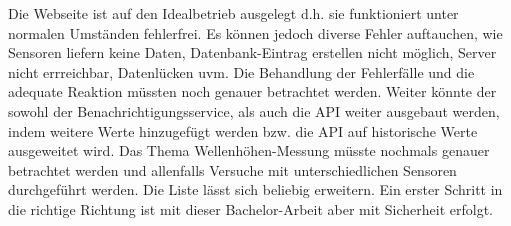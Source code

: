 

Die Webseite ist auf den Idealbetrieb ausgelegt d.h. sie funktioniert unter normalen Umständen fehlerfrei. Es können jedoch diverse Fehler auftauchen, wie Sensoren liefern keine Daten, Datenbank-Eintrag erstellen nicht möglich, Server nicht errreichbar, Datenlücken uvm. Die Behandlung der Fehlerfälle und die adequate Reaktion müssten noch genauer betrachtet werden. Weiter könnte der sowohl der Benachrichtigungsservice, als auch die API weiter ausgebaut werden, indem weitere Werte hinzugefügt werden bzw. die API auf historische Werte ausgeweitet wird. Das Thema Wellenhöhen-Messung müsste nochmals genauer betrachtet werden und allenfalls Versuche mit unterschiedlichen Sensoren durchgeführt werden.
Die Liste lässt sich beliebig erweitern. Ein erster Schritt in die richtige Richtung ist mit dieser Bachelor-Arbeit aber mit Sicherheit erfolgt.
